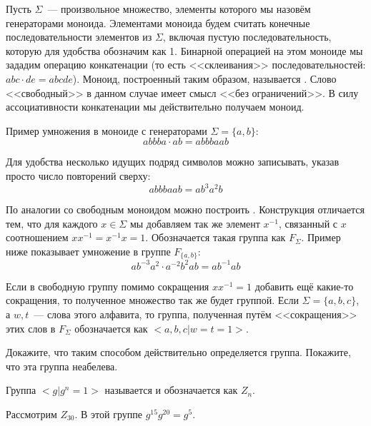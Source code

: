 \begin{example}
	Пусть $\Sigma$~--- произвольное множество, элементы которого мы назовём генераторами моноида. Элементами моноида будем считать конечные последовательности элементов из $\Sigma$, включая пустую последовательность, которую для удобства обозначим как 1. Бинарной операцией на этом моноиде мы зададим операцию конкатенации (то есть <<склеивания>> последовательностей: $abc\cdot de = abcde$). Моноид, построенный таким образом, называется . Слово <<свободный>> в данном случае имеет смысл <<без ограничений>>. В силу ассоциативности конкатенации мы действительно получаем моноид.
\end{example}

\begin{example}
	Пример умножения в моноиде с генераторами $\Sigma=\{a, b\}$:
	\[
	abbba\cdot ab = abbbaab
	\]
\end{example}

Для удобства несколько идущих подряд символов можно записывать, указав просто число повторений сверху:
\[
abbbaab = ab^3a^2b
\]

\begin{example}
	По аналогии со свободным моноидом можно построить . Конструкция отличается тем, что для каждого $x\in\Sigma$ мы добавляем так же  элемент $x^{-1}$, связанный с $x$ соотношением $xx^{-1}=x^{-1}x=1$. Обозначается такая группа как $F_\Sigma$. Пример ниже показывает умножение в группе $F_{\{a, b\}}$:
	\[
	ab^{-3}a^2\cdot a^{-2}b^2ab = ab^{-1}ab
	\]
\end{example}

Если в свободную группу помимо сокращения $xx^{-1}=1$ добавить ещё какие-то сокращения, то полученное множество так же будет группой. Если $\Sigma = \{a, b, c\}$, а $w, t$~--- слова этого алфавита, то группа, полученная путём <<сокращения>> этих слов в $F_\Sigma$ обозначается как $<a, b, c | w = t = 1>$.

\begin{exercise}
	Докажите, что таким способом действительно определяется группа. Покажите, что эта группа неабелева.
\end{exercise}

\begin{example}
	Группа $<g|g^n = 1>$ называется  и обозначается как $Z_n$.
\end{example}

\begin{example}
	Рассмотрим $Z_{30}$. В этой группе $g^{15}g^{20} = g^5$.
\end{example}

